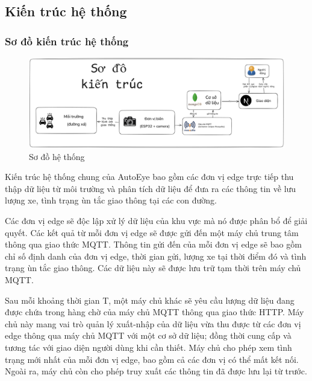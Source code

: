 \subsection{Kiến trúc hệ thống}

\subsubsection{Sơ đồ kiến trúc hệ thống}



\begin{figure}[H]
    \centering
    \includegraphics[width=1\textwidth]{image/architecture.png}
    \caption{Sơ đồ hệ thống}
    \label{fig:architecture}
\end{figure}



\quad Kiến trúc hệ thống chung của AutoEye bao gồm các đơn vị edge trực tiếp thu thập dữ liệu từ môi trường và phân tích dữ liệu để đưa ra các thông tin về lưu lượng xe, tình trạng ùn tắc giao thông tại các con đường.

\quad Các đơn vị edge sẽ độc lập xử lý dữ liệu của khu vực mà nó được phân bổ để giải quyết. Các kết quả từ mỗi đơn vị edge sẽ được gửi đến một máy chủ trung tâm thông qua giao thức MQTT. Thông tin gửi đến của mỗi đơn vị edge sẽ bao gồm chỉ số định danh của đơn vị edge, thời gian gửi, lượng xe tại thời điểm đó và tình trạng ùn tắc giao thông. Các dữ liệu này sẽ được lưu trữ tạm thời trên máy chủ MQTT.

\quad Sau mỗi khoảng thời gian T, một máy chủ khác sẽ yêu cầu lượng dữ liệu đang được chứa trong hàng chờ của máy chủ MQTT thông qua giao thức HTTP. Máy chủ này mang vai trò quản lý xuất-nhập của dữ liệu vừa thu được từ các đơn vị edge thông qua máy chủ MQTT với một cơ sở dữ liệu; đồng thời cung cấp và tương tác với giao diện người dùng khi cần thiết. Máy chủ cho phép xem tình trạng mới nhất của mỗi đơn vị edge, bao gồm cả các đơn vị có thể mất kết nối. Ngoài ra, máy chủ còn cho phép truy xuất các thông tin đã được lưu lại từ trước.

